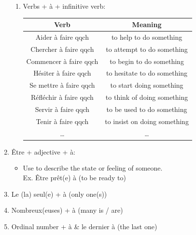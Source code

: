 \documentclass{book}
\begin{document}
\begin{enumerate}
\begin{enumerate}
                        \item Verbs + à + infinitive verb:
                            \begin{center}
                                \begin{tabular}{|c|c|}
                                    \hline
                                    \textbf{Verb} & \textbf{Meaning}\\
                                    \hline
                                    Aider à faire qqch & to help to do something \\
                                    Chercher à faire qqch & to attempt to do something \\
                                    Commencer à faire qqch & to begin to do something \\
                                    Hésiter à faire qqch & to hesitate to do something \\
                                    Se mettre à faire qqch & to start doing something \\
                                    Réfléchir à faire qqch & to think of doing something \\
                                    Servir à faire qqch & to be used to do something \\
                                    Tenir à faire qqch  & to insist on doing something \\
                                    \dots & \dots \\
                                    \hline
                                \end{tabular}
                            \end{center}
                    \end{enumerate}
                
                \item Être + adjective + à:
                    \begin{itemize}
                        \item Use to describe the state or feeling of someone. \\
                                Ex. Être prêt(e) à (to be ready to)
                    \end{itemize}
                
                \item Le (la) seul(e) + à (only one(s))
                \item Nombreux(euses) + à (many is / are)
                \item Ordinal number + à \& le dernier à (the last one)
                    
            \end{enumerate}
\end{document}
